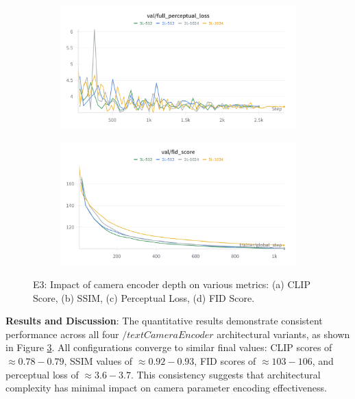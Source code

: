 \begin{figure}[htbp]
  \begin{subfigure}[b]{0.48\textwidth}
    \centering
    \includegraphics[width=\textwidth]{images/experiments/cam_depth/perceptual.png}
    \label{fig:exp_cam_depth_perceptual}
  \end{subfigure}
  \hfill
  \begin{subfigure}[b]{0.48\textwidth}
    \centering
    \includegraphics[width=\textwidth]{images/experiments/cam_depth/fid.png}
    \label{fig:exp_cam_depth_train_loss}
  \end{subfigure}

  \caption{E3: Impact of camera encoder depth on various metrics: (a) CLIP Score, (b) SSIM, (c) Perceptual Loss, (d) FID Score.}
  \label{fig:exp_cam_depth_metrics_grid}
\end{figure}

\textbf{Results and Discussion}:
The quantitative results demonstrate consistent performance across all four $/text{CameraEncoder}$ architectural variants, as shown in Figure \ref{fig:exp_cam_depth_metrics_grid}. All configurations converge to similar final values: CLIP scores of $\approx 0.78-0.79$, SSIM values of $\approx 0.92-0.93$, FID scores of $\approx 103-106$, and perceptual loss of $\approx 3.6-3.7$. This consistency suggests that architectural complexity has minimal impact on camera parameter encoding effectiveness.

